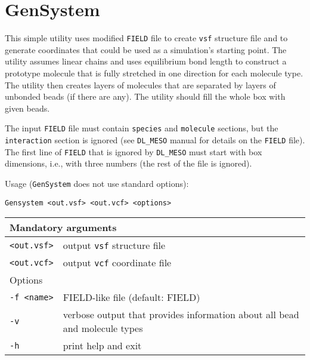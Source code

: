 \section{GenSystem} \label{sec:GenSystem}

This simple utility uses modified \texttt{FIELD} file to create
\texttt{vsf} structure file and to generate coordinates that could be used
as a simulation's starting point. The utility assumes linear chains and
uses equilibrium bond length to construct a prototype molecule that is
fully stretched in one direction for each molecule type. The utility then
creates layers of molecules that are separated by layers of unbonded beads
(if there are any). The utility should fill the whole box with given beads.

The input \texttt{FIELD} file must contain \texttt{species} and
\texttt{molecule} sections, but the \texttt{interaction} section is ignored
(see \texttt{DL\_MESO} manual for details on the \texttt{FIELD} file). The
first line of \texttt{FIELD} that is ignored by \texttt{DL\_MESO} must
start with box dimensions, i.e., with three numbers (the rest of the file
is ignored).

Usage (\texttt{GenSystem} does not use standard options):

\vspace{1em}
\noindent
\texttt{Gensystem <out.vsf> <out.vcf> <options>}

\noindent
\begin{longtable}{p{}p{}}
  \toprule
  \multicolumn{2}{l}{Mandatory arguments} \\
  \midrule
  \texttt{<out.vsf>} & output \texttt{vsf} structure file \\
  \texttt{<out.vcf>} & output \texttt{vcf} coordinate file \\
  \toprule
  \multicolumn{2}{l}{Options} \\
  \midrule
  \texttt{-f <name>} & FIELD-like file (default: FIELD)\\
  \texttt{-v}        & verbose output that provides information about all
    bead and molecule types \\
  \texttt{-h}        & print help and exit \\
  \bottomrule
\end{longtable}
